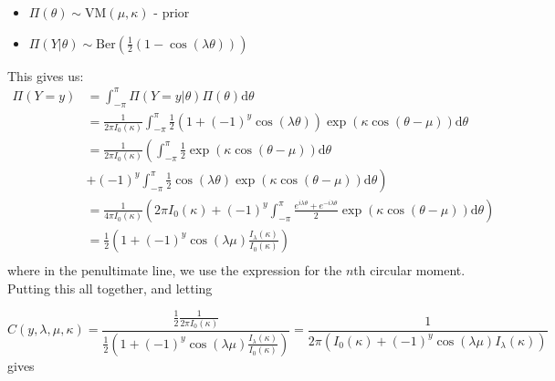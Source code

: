\documentclass[]{report}
\begin{document}
\begin{itemize}
	\item $\Pi(\theta) \sim \text{VM}(\mu, \kappa)$ - prior
	\item $\Pi(Y | \theta) \sim \text{Ber}(\frac{1}{2}(1 - \cos(\lambda \theta)))$
\end{itemize}

This gives us:
\begin{align*}
	\Pi(Y = y) &= \int_{-\pi}^{\pi} \Pi(Y = y | \theta) \Pi\left( \theta \right) \text{d}\theta \\
		   &= \frac{1}{2 \pi I_0(\kappa)} \int_{- \pi}^{\pi} \frac{1}{2} (1 + (-1)^y \cos(\lambda \theta)) \exp(\kappa \cos(\theta - \mu)) \text{d} \theta \\
	&= \frac{1}{2 \pi I_0(\kappa)} \left( \int_{- \pi}^{\pi} \frac{1}{2} \exp(\kappa \cos(\theta - \mu)) \text{d} \theta \right. \\
	 &\left. + (-1)^y \int_{- \pi}^{\pi} \frac{1}{2} \cos(\lambda \theta) \exp(\kappa \cos(\theta - \mu)) \text{d} \theta  \right) \\
	 &= \frac{1}{4 \pi I_0\left( \kappa \right) }\left( 2\pi I_0\left( \kappa \right)  + (-1)^{y} \int_{-\pi}^{\pi}\frac{e^{i \lambda \theta} + e^{-i \lambda \theta}}{2}\exp\left( \kappa \cos \left( \theta - \mu \right)  \right) \text{d}\theta \right) \\
	&= \frac{1}{2}\left(1 + (-1)^y \cos(\lambda \mu) \frac{I_\lambda(\kappa)}{I_0(\kappa)}\right)  \\
\end{align*}
where in the penultimate line, we use the expression for the $n$th circular moment.
Putting this all together, and letting

\[
C(y, \lambda, \mu, \kappa) = \frac{\frac{1}{2} \frac{1}{2 \pi I_0(\kappa)}}{\frac{1}{2} (1 + (-1)^y \cos(\lambda \mu) \frac{I_\lambda(\kappa)}{I_0(\kappa)} )} = \frac{1}{ 2 \pi(I_0(\kappa) + (-1)^y \cos(\lambda \mu) I_\lambda(\kappa))}
\]
gives
\end{document}
